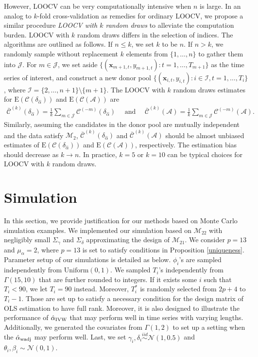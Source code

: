 \documentclass[11pt]{article}
\def\mbf#1{\mathbf{#1}} %
\newcommand{\simiid}{\stackrel{iid}{\sim}} %
\def\mrm#1{\mathrm{#1}} %
\def\normal#1#2{\mathcal{N}(#1,#2)} %
\def\mc#1{\mathcal{#1}} %
\def\E#1{\mathrm{E}(#1)} %
\theoremstyle{definition}
\begin{document}
However, LOOCV can be very computationally intensive when $n$ is large. In an analog to $k$-fold cross-validation as remedies for ordinary LOOCV, we propose a similar procedure \emph{LOOCV with $k$ random draws} to alleviate the computation burden. LOOCV with $k$ random draws differs in the selection of indices. The algorithms are outlined as follows. If $n \leq  k$, we set $k$ to be $n$. If $n > k$, we randomly sample without replacement $k$ elements from $\{1, \ldots, n\}$ to gather them into $\mc{J}$. For $m \in \mc{J}$, we set aside $\{(\mbf{x}_{m + 1, t}, y_{m + 1, t}) \colon t = 1, \ldots, T_{m+1}\}$ as the time series of interest, and construct a new donor pool $\{(\mbf{x}_{i, t}, y_{i, t}) \colon i \in \mc{I}, t = 1, \ldots, T_{i}\}$, where $\mc{I}=\{2, \ldots, n+1\} \setminus \{m+1\}$. The LOOCV with $k$ random draws estimates for $\E{\mc{C}(\delta_{\hat{\alpha}})}$  and $\E{\mc{C}(\mc{A})}$ are
\begin{align*}
	 \bar{\mc{C}}^{(k)}(\delta_{\hat{\alpha}})= \frac{1}{k} \sum_{m \in \mc{J}} \mc{C} ^{(-m)}(\delta_{\hat{\alpha}})
	 \quad \text{ and } \quad \bar{\mc{C}}^{(k)}(\mc{A})= \frac{1}{k} \sum_{m \in \mc{J}} \mc{C} ^{(-m)}(\mc{A}).
\end{align*}
Similarly, assuming the candidates in the donor pool are  mutually independent and the data  satisfy $\mc{M}_{2}$, $\bar{\mc{C}}^{(k)}(\delta_{\hat{\alpha}})$ and $\bar{\mc{C}}^{(k)}(\mc{A})$ should be almost unbiased estimates of $\E{\mc{C}(\delta_{\hat{\alpha}})}$ and $\E{\mc{C}(\mc{A})}$, respectively. The estimation bias should decrease as $k \to n$.  In practice, $k=5$ or $k=10$ can be typical choices for LOOCV with $k$ random draws. 
 


\section{Simulation}

\label{simulation}


In this section, we provide justification for our methods based on Monte Carlo simulation examples. We implemented our simulation based on $\mc{M}_{22}$ with negligibly small $\Sigma_{\gamma}$ and $\Sigma_{\delta}$ approximating the design of $\mathcal{M}_{21}$.  We consider $p=13$ and $\mu_{\alpha}=2$, where $p = 13$ is set to satisfy conditions in Proposition \ref{uniqueness}. Parameter setup of our simulations is detailed as below. $\phi_i$'s are sampled independently from $\mrm{Uniform}(0,1)$. We  sampled $T_i$'s  independently from  $\Gamma(15, 10)$ that are further rounded to integers. If it exists some  $i$ such that  $T_i < 90$, we let $T_i=90$ instead.  Moreover, $T_i^*$ is randomly selected from $2p + 4$ to $T_i-1$. Those are set up to satisfy a necessary condition for the design matrix of OLS estimation to have full rank. Moreover, it is also designed to illustrate the performance of $\hat{\alpha}_{\rm IVW}$ that may perform well in time series with varying lengths. Additionally, we generated the covariates from $\Gamma(1,2)$ to set up a setting when the $\hat{\alpha}_{\rm wadj}$ may perform well. Last, we set $\gamma_i, \delta_i\simiid  \normal{1}{0.5}$ and $\theta_i, \beta_i \sim \normal{0}{1}$.
\end{document}
